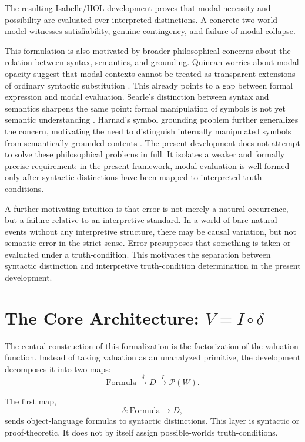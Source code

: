 \documentclass[11pt,a4paper]{article}
\begin{document}
The resulting Isabelle/HOL development proves that modal necessity and possibility are evaluated over interpreted distinctions. A concrete two-world model witnesses satisfiability, genuine contingency, and failure of modal collapse.

This formulation is also motivated by broader philosophical concerns about the relation between syntax, semantics, and grounding. Quinean worries about modal opacity suggest that modal contexts cannot be treated as transparent extensions of ordinary syntactic substitution \cite{Quine1953}. This already points to a gap between formal expression and modal evaluation. Searle's distinction between syntax and semantics sharpens the same point: formal manipulation of symbols is not yet semantic understanding \cite{Searle1980}. Harnad's symbol grounding problem further generalizes the concern, motivating the need to distinguish internally manipulated symbols from semantically grounded contents \cite{Harnad1990}. The present development does not attempt to solve these philosophical problems in full. It isolates a weaker and formally precise requirement: in the present framework, modal evaluation is well-formed only after syntactic distinctions have been mapped to interpreted truth-conditions.

A further motivating intuition is that error is not merely a natural occurrence, but a failure relative to an interpretive standard. In a world of bare natural events without any interpretive structure, there may be causal variation, but not semantic error in the strict sense. Error presupposes that something is taken or evaluated under a truth-condition. This motivates the separation between syntactic distinction and interpretive truth-condition determination in the present development.

\section{The Core Architecture: $V = I \circ \delta$}

The central construction of this formalization is the factorization of the valuation function. Instead of taking valuation as an unanalyzed primitive, the development decomposes it into two maps:
\[
\mathrm{Formula} \xrightarrow{\delta} D \xrightarrow{I} \mathcal{P}(W).
\]

The first map,
\[
\delta : \mathrm{Formula} \to D,
\]
sends object-language formulas to syntactic distinctions. This layer is syntactic or proof-theoretic. It does not by itself assign possible-worlds truth-conditions.
\end{document}
